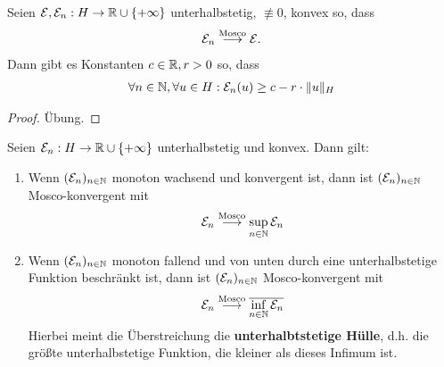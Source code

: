 \begin{lemma}
	Seien $\mathcal{E},\mathcal{E}_n:H\to\mathbb{R}\cup\lbrace+\infty\rbrace$ unterhalbstetig, $\not\equiv0$, konvex so, dass 
	\begin{align*}
		\mathcal{E}_n\overset{\text{Mosco}}{\longrightarrow}\mathcal{E}.
	\end{align*}
	Dann gibt es Konstanten $c\in\mathbb{R},r>0$ so, dass 
	\begin{align*}
		\forall n\in\mathbb{N},\forall u\in H:
		\mathcal{E}_n(u)\geq c-r\cdot\Vert u\Vert_H
	\end{align*}
\end{lemma}

\begin{proof}
	Übung.
\end{proof}

\begin{theorem}
	Seien $\mathcal{E}_n:H\to\mathbb{R}\cup\lbrace+\infty\rbrace$ unterhalbstetig und konvex.
	Dann gilt:
	\begin{enumerate}[label=(\alph*)]
		\item Wenn $(\mathcal{E}_n)_{n\in\mathbb{N}}$ monoton wachsend und konvergent ist, dann ist $(\mathcal{E}_n)_{n\in\mathbb{N}}$ Mosco-konvergent mit
		\begin{align*}
			\mathcal{E}_n\overset{\text{Mosco}}{\longrightarrow}\sup\limits_{n\in\mathbb{N}}\mathcal{E}_n
		\end{align*}
		\item Wenn $(\mathcal{E}_n)_{n\in\mathbb{N}}$ monoton fallend und von unten durch eine unterhalbstetige Funktion beschränkt ist,
		dann ist $(\mathcal{E}_n)_{n\in\mathbb{N}}$ Mosco-konvergent mit
		\begin{align*}
			\mathcal{E}_n\overset{\text{Mosco}}{\longrightarrow}\overline{\inf\limits_{n\in\mathbb{N}}\mathcal{E}_n}
		\end{align*}
		Hierbei meint die Überstreichung die \textbf{unterhalbtstetige Hülle}, d.h. die größte unterhalbstetige Funktion, die kleiner als dieses Infimum ist.
	\end{enumerate}
\end{theorem}

